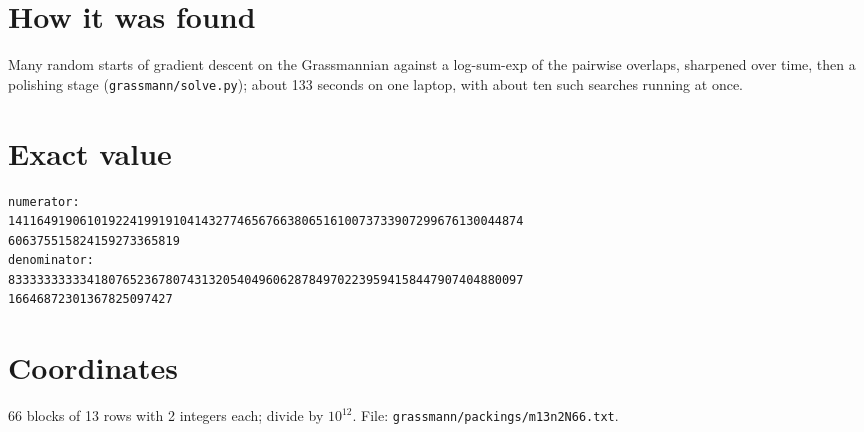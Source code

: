 \documentclass[11pt,a4paper]{article}
\begin{document}
\section{How it was found}
Many random starts of gradient descent on the Grassmannian against a log-sum-exp of the pairwise overlaps, sharpened over time, then a polishing stage (\texttt{grassmann/solve.py}); about 133 seconds on one laptop, with about ten such searches running at once.


\appendix
\section{Exact value}
{\small
\begin{verbatim}
numerator:
141164919061019224199191041432774656766380651610073733907299676130044874
606375515824159273365819
denominator:
833333333334180765236780743132054049606287849702239594158447907404880097
16646872301367825097427
\end{verbatim}}

\section{Coordinates}
66 blocks of 13 rows with 2 integers each; divide by $10^{12}$. File: \texttt{grassmann/packings/m13n2N66.txt}.
{\tiny
\begin{multicols}{4}
\end{multicols}}
\end{document}
